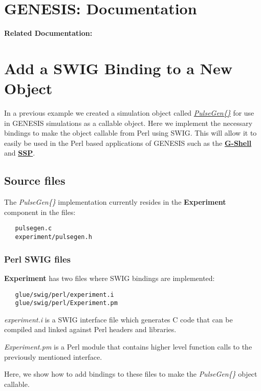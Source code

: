 \documentclass[12pt]{article}
\begin{document}
\section*{GENESIS: Documentation}

{\bf Related Documentation:}

\section*{Add a SWIG Binding to a New Object}

In a previous example we created a simulation object called \href{../genesis-add-object-solver/genesis-add-object-solver.tex}{\it PulseGen\{\}} for use in GENESIS simulations as a callable object. Here we implement the necessary bindings to make the object callable from Perl using SWIG. This will allow it to easily be used in the Perl based applications of GENESIS such as the \href{../gshell/gshell.tex}{\bf G-Shell} and \href{../ssp/ssp.tex}{\bf SSP}.

\subsection*{Source files}

The {\it PulseGen\{\}} implementation currently resides in the {\bf Experiment} component in the files:
\begin{verbatim}
   pulsegen.c
   experiment/pulsegen.h
\end{verbatim}

\subsubsection*{Perl SWIG files}

{\bf Experiment} has two files where SWIG bindings are implemented:

\begin{verbatim}
   glue/swig/perl/experiment.i
   glue/swig/perl/Experiment.pm
\end{verbatim}

{\it experiment.i} is a SWIG interface file which generates C code that can be compiled and linked against Perl headers and libraries.

{\it Experiment.pm} is a Perl module that contains higher level function calls to the previously mentioned interface.

Here, we show how to add bindings to these files to make the {\it PulseGen\{\}} object callable.
\end{document}
